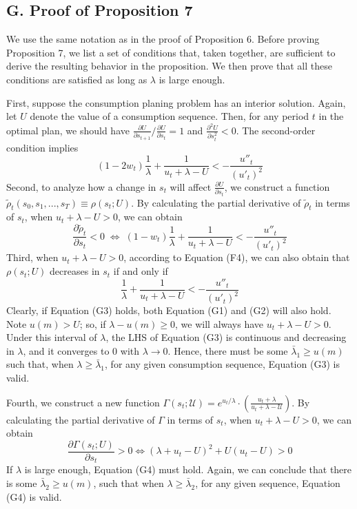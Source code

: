 \documentclass[
  12pt,
]{article}
\begin{document}
\hypertarget{g.-proof-of-proposition-7}{%
\subsection*{G. Proof of Proposition
7}\label{g.-proof-of-proposition-7}}

We use the same notation as in the proof of Proposition 6. Before
proving Proposition 7, we list a set of conditions that, taken together,
are sufficient to derive the resulting behavior in the proposition. We
then prove that all these conditions are satisfied as long as
\(\lambda\) is large enough.

First, suppose the consumption planing problem has an interior solution.
Again, let \(U\) denote the value of a consumption sequence. Then, for
any period \(t\) in the optimal plan, we should have
\(\frac{\partial U}{\partial s_{t+1}}/\frac{\partial U}{\partial s_{t}}=1\)
and \(\frac{\partial^2 U}{\partial s_t^2}<0\). The second-order
condition
implies\[\tag{G1} (1-2w_t)\frac{1}{\lambda} + \frac{1}{u_t+\lambda-U} < -\frac{u''_t}{(u'_t)^2}  \]Second,
to analyze how a change in \(s_t\) will affect
\(\frac{\partial U}{\partial s_t}\), we construct a function
\(\tilde{\rho}_t(s_0,s_1,...,s_T)\equiv\rho(s_t;U)\). By calculating the
partial derivative of \(\tilde{\rho}_t\) in terms of \(s_t\), when
\(u_t+\lambda-U>0\), we can
obtain\[\tag{G2} \frac{\partial \tilde{\rho}_t}{\partial s_t} <0 \;\Longleftrightarrow\; (1-w_t)\frac{1}{\lambda}+\frac{1}{u_t+\lambda-U}<-\frac{u''_t}{(u'_t)^2} \]Third,
when \(u_t+\lambda-U>0\), according to Equation (F4), we can also obtain
that \(\rho(s_t;U)\) decreases in \(s_t\) if and only
if\[\tag{G3} \frac{1}{\lambda}+\frac{1}{u_t+\lambda-U}<-\frac{u''_t}{(u'_t)^2} \]Clearly,
if Equation (G3) holds, both Equation (G1) and (G2) will also hold. Note
\(u(m)>U\); so, if \(\lambda - u(m)\geq 0\), we will always have
\(u_t+\lambda-U>0\). Under this interval of \(\lambda\), the LHS of
Equation (G3) is continuous and decreasing in \(\lambda\), and it
converges to 0 with \(\lambda \rightarrow 0\). Hence, there must be some
\(\bar{\lambda}_1 \geq u(m)\) such that, when
\(\lambda\geq \bar{\lambda}_1\), for any given consumption sequence,
Equation (G3) is valid.

Fourth, we construct a new function
\(\Gamma(s_t;\mathcal{U})=e^{u_t/\lambda}\cdot\left(\frac{u_t+\lambda}{u_t+\lambda -\mathcal{U}}\right)\).
By calculating the partial derivative of \(\Gamma\) in terms of \(s_t\),
when \(u_t+\lambda-U>0\), we can obtain\[
\tag{G4} \frac{\partial\Gamma(s_t;U)}{\partial s_t}>0 \Longleftrightarrow (\lambda +u_t-U)^2+U(u_t-U)>0
\]If \(\lambda\) is large enough, Equation (G4) must hold. Again, we can
conclude that there is some \(\bar{\lambda}_2\geq u(m)\), such that when
\(\lambda \geq \bar{\lambda}_2\), for any given sequence, Equation (G4)
is valid.
\end{document}
